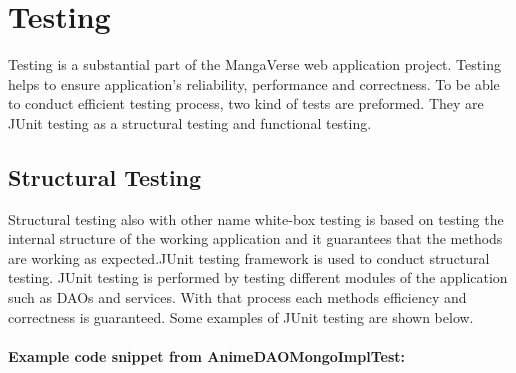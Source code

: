 \chapter{Testing}
Testing is a substantial part of the MangaVerse web application project. Testing helps to ensure application's
reliability, performance and correctness. To be able to conduct efficient testing process, two kind of tests are preformed.
They are JUnit testing as a structural testing and functional testing.

\section{Structural Testing}
Structural testing also with other name white-box testing is based on testing the internal structure of the working application and it
guarantees that the methods are working as expected.JUnit testing framework is used to conduct structural testing. JUnit testing is performed by testing
different modules of the application such as DAOs and services. With that process each methods efficiency and correctness is guaranteed.
Some examples of JUnit testing are shown below.\\ \\


\textbf{Example code snippet from AnimeDAOMongoImplTest:}

